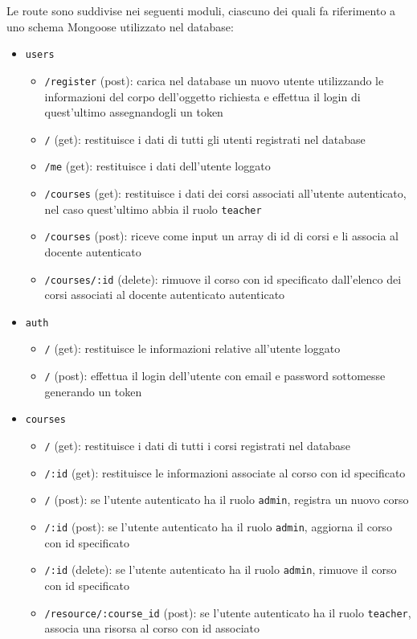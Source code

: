 Le route sono suddivise nei seguenti moduli, ciascuno dei quali fa riferimento a uno schema Mongoose utilizzato nel database:
\begin{itemize}
	\item \texttt{users}
	\begin{itemize}
		\item \texttt{/register} (post): carica nel database un nuovo utente utilizzando le informazioni del corpo dell'oggetto richiesta e effettua il login di quest'ultimo assegnandogli un token
		\item \texttt{/} (get): restituisce i dati di tutti gli utenti registrati nel database
		\item \texttt{/me} (get): restituisce i dati dell'utente loggato
		\item \texttt{/courses} (get): restituisce i dati dei corsi associati all'utente autenticato, nel caso quest'ultimo abbia il ruolo \texttt{teacher}
		\item \texttt{/courses} (post): riceve come input un array di id di corsi e li associa al docente autenticato
		\item \texttt{/courses/:id} (delete): rimuove il corso con id specificato dall'elenco dei corsi associati al docente autenticato autenticato
	\end{itemize}
	\item \texttt{auth}
	\begin{itemize}
		\item \texttt{/} (get): restituisce le informazioni relative all'utente loggato
		\item \texttt{/} (post): effettua il login dell'utente con email e password sottomesse generando un token
	\end{itemize}
	\item \texttt{courses}
	\begin{itemize}
		\item \texttt{/} (get): restituisce i dati di tutti i corsi registrati nel database
		\item \texttt{/:id} (get): restituisce le informazioni associate al corso con id specificato
		\item \texttt{/} (post): se l'utente autenticato ha il ruolo \texttt{admin}, registra un nuovo corso
		\item \texttt{/:id} (post): se l'utente autenticato ha il ruolo \texttt{admin}, aggiorna il corso con id specificato
		\item \texttt{/:id} (delete): se l'utente autenticato ha il ruolo \texttt{admin}, rimuove il corso con id specificato
		\item \texttt{/resource/:course\_id} (post): se l'utente autenticato ha il ruolo \texttt{teacher}, associa una risorsa al corso con id associato
	\end{itemize}
\end{itemize}

